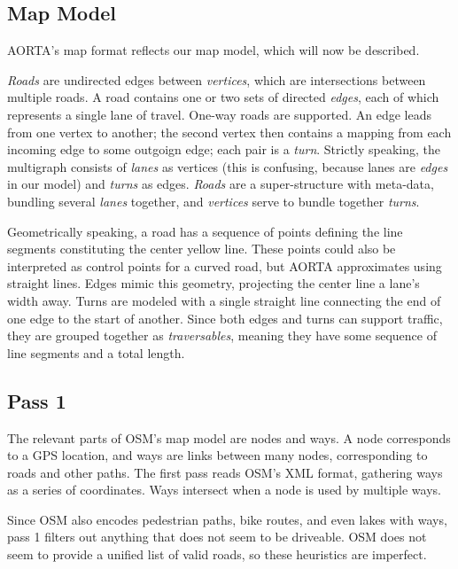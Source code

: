 \documentclass[letterpaper, 10 pt, conference]{ieeeconf}  %
\begin{document}
\subsection{Map Model}

AORTA's map format reflects our map model, which will now be described.


\emph{Roads} are undirected edges between \emph{vertices}, which are
intersections between multiple roads. A road contains one or two sets of
directed \emph{edges}, each of which represents a single lane of travel. One-way
roads are supported. An edge leads from one vertex to another; the second vertex
then contains a mapping from each incoming edge to some outgoign edge; each pair
is a \emph{turn}. Strictly speaking, the multigraph consists of \emph{lanes} as
vertices (this is confusing, because lanes are \emph{edges} in our model) and
\emph{turns} as edges. \emph{Roads} are a super-structure with meta-data,
bundling several \emph{lanes} together, and \emph{vertices} serve to bundle
together \emph{turns}.

Geometrically speaking, a road has a sequence of points defining the line
segments constituting the center yellow line. These points could also be
interpreted as control points for a curved road, but AORTA approximates using
straight lines. Edges mimic this geometry, projecting the center line a lane's
width away. Turns are modeled with a single straight line connecting the end of
one edge to the start of another. Since both edges and turns can support
traffic, they are grouped together as \emph{traversables}, meaning they have
some sequence of line segments and a total length.

\subsection{Pass 1}

The relevant parts of OSM's map model are nodes and ways. A node corresponds to
a GPS location, and ways are links between many nodes, corresponding to roads
and other paths. The first pass reads OSM's XML format, gathering ways as a
series of coordinates. Ways intersect when a node is used by multiple ways.

Since OSM also encodes pedestrian paths, bike routes, and even lakes with ways,
pass 1 filters out anything that does not seem to be driveable. OSM does not
seem to provide a unified list of valid roads, so these heuristics are
imperfect.
\end{document}
